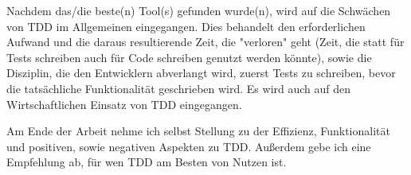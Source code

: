 Nachdem das/die beste(n) Tool(s) gefunden wurde(n), wird auf die Schwächen von TDD
im Allgemeinen eingegangen. Dies behandelt den erforderlichen Aufwand und die
daraus resultierende Zeit, die "verloren" geht (Zeit, die statt für Tests
schreiben auch für Code schreiben genutzt werden könnte), sowie die Disziplin,
die den Entwicklern abverlangt wird, zuerst Tests zu schreiben, bevor die
tatsächliche Funktionalität geschrieben wird. Es wird auch auf den
Wirtschaftlichen Einsatz von TDD eingegangen.

Am Ende der Arbeit nehme ich selbst Stellung zu der Effizienz, Funktionalität und positiven, sowie negativen Aspekten zu TDD. Außerdem gebe ich eine Empfehlung ab, für wen TDD am Besten von Nutzen ist.

